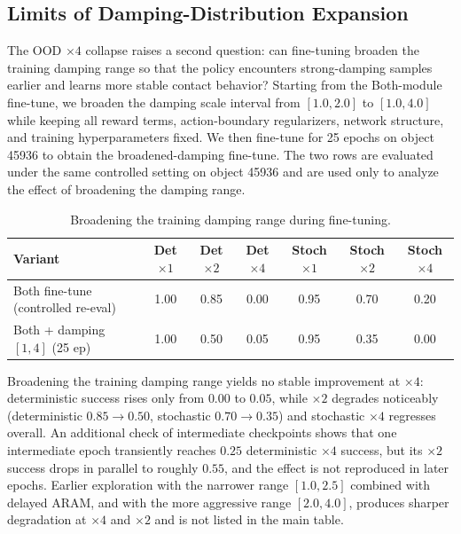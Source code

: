 \documentclass{llmxive}
\begin{document}
\subsection{Limits of Damping-Distribution Expansion}
\label{sec:damprangeexp}

The OOD $\times4$ collapse raises a second question: can fine-tuning
broaden the training damping range so that the policy encounters
strong-damping samples earlier and learns more stable contact
behavior? Starting from the Both-module fine-tune, we broaden the
damping scale interval from $[1.0, 2.0]$ to $[1.0, 4.0]$ while
keeping all reward terms, action-boundary regularizers, network
structure, and training hyperparameters fixed. We then fine-tune for
25 epochs on object 45936 to obtain
the broadened-damping fine-tune. The two rows are evaluated under the
same controlled setting on object 45936 and are used only to analyze
the effect of broadening the damping range.

\begin{table}[t]
\centering
\small
\begin{tabular}{lcccccc}
\toprule
Variant & Det $\times1$ & Det $\times2$ & Det $\times4$ & Stoch $\times1$ & Stoch $\times2$ & Stoch $\times4$ \\
\midrule
Both fine-tune (controlled re-eval) & 1.00 & 0.85 & 0.00 & 0.95 & 0.70 & 0.20 \\
Both + damping $[1,4]$ (25 ep)   & 1.00 & 0.50 & 0.05 & 0.95 & 0.35 & 0.00 \\
\bottomrule
\end{tabular}
\caption{Broadening the training damping range during fine-tuning.}
\label{tab:damprange}
\end{table}

Broadening the training damping range yields no stable improvement
at $\times4$: deterministic success rises only from $0.00$ to $0.05$,
while $\times2$ degrades noticeably (deterministic
$0.85 \to 0.50$, stochastic $0.70 \to 0.35$) and stochastic $\times4$
regresses overall. An additional check of intermediate checkpoints
shows that one intermediate epoch transiently reaches $0.25$
deterministic $\times4$ success, but its $\times2$ success drops in parallel
to roughly $0.55$, and the effect is not reproduced in later epochs.
Earlier exploration with the narrower range $[1.0, 2.5]$ combined
with delayed ARAM, and with the more aggressive range $[2.0, 4.0]$,
produces sharper degradation at $\times4$ and $\times2$ and is not listed in
the main table.
\end{document}
